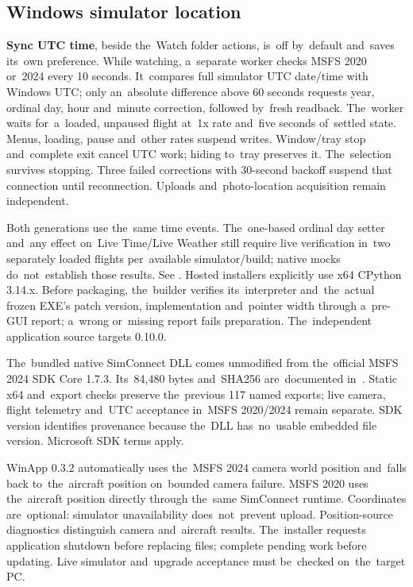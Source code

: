 \documentclass[11pt,a4paper]{article}
\newcommand{\filepath}[1]{\path{#1}}
\newcommand{\ui}[1]{\textbf{#1}}
\begin{document}
\subsection{Windows simulator location}

\ui{Sync UTC time}, beside the~Watch folder actions, is~off by~default and~saves
its~own preference. While watching, a~separate worker checks MSFS 2020 or~2024
every 10 seconds. It~compares full simulator UTC date/time with Windows UTC;
only an~absolute difference above 60 seconds requests year, ordinal day, hour
and~minute correction, followed by~fresh readback. The~worker waits
for~a~loaded,
unpaused flight at~1x rate and~five seconds of~settled state. Menus, loading,
pause and~other rates suspend writes. Window/tray stop and~complete exit cancel
UTC work; hiding to~tray preserves it. The~selection survives stopping.
Three failed corrections with 30-second backoff suspend that connection until
reconnection. Uploads and~photo-location acquisition remain independent.

Both generations use the~same time events. The~one-based ordinal day setter
and~any effect on~Live Time/Live Weather still require live verification
in~two separately loaded flights per~available simulator/build; native mocks
do~not~establish those results. See \filepath{winapp/README.md}.
Hosted installers explicitly use x64 CPython 3.14.x. Before packaging,
the~builder verifies its~interpreter and~the~actual frozen EXE's patch version,
implementation and~pointer width through a~pre-GUI report; a~wrong or~missing
report fails preparation. The~independent application source targets 0.10.0.

The~bundled native SimConnect DLL comes unmodified from the~official
MSFS 2024 SDK Core 1.7.3. Its~84,480 bytes and~SHA256 are~documented
in~\filepath{winapp/README.md}. Static x64 and~export checks preserve
the~previous 117 named exports; live camera, flight telemetry and~UTC acceptance
in~MSFS 2020/2024 remain separate. SDK version identifies provenance because
the~DLL has~no~usable embedded file version. Microsoft SDK terms apply.

WinApp 0.3.2 automatically uses the~MSFS 2024 camera world position and~falls
back to~the~aircraft position on~bounded camera failure. MSFS 2020 uses
the~aircraft position directly through the~same SimConnect runtime. Coordinates
are~optional: simulator unavailability does~not~prevent upload. Position-source
diagnostics distinguish camera and~aircraft results. The~installer requests
application shutdown before replacing files; complete pending work before
updating. Live simulator and~upgrade acceptance must be~checked on~the~target
PC.
\end{document}
